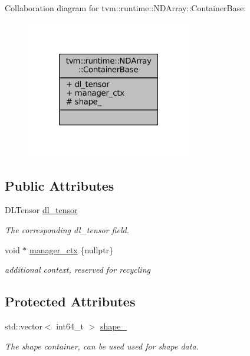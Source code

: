 Collaboration diagram for tvm\+:\+:runtime\+:\+:N\+D\+Array\+:\+:Container\+Base\+:
\nopagebreak
\begin{figure}[H]
\begin{center}
\leavevmode
\includegraphics[width=205pt]{classtvm_1_1runtime_1_1NDArray_1_1ContainerBase__coll__graph}
\end{center}
\end{figure}
\subsection*{Public Attributes}
\begin{DoxyCompactItemize}
\item 
D\+L\+Tensor \hyperlink{classtvm_1_1runtime_1_1NDArray_1_1ContainerBase_a1063a9d01075d5b7b0e8fa31d4d72e0b}{dl\+\_\+tensor}
\begin{DoxyCompactList}\small\item\em The corresponding dl\+\_\+tensor field. \end{DoxyCompactList}\item 
void $\ast$ \hyperlink{classtvm_1_1runtime_1_1NDArray_1_1ContainerBase_a56d07e60df973dcf2b99ef6a204bb184}{manager\+\_\+ctx} \{nullptr\}
\begin{DoxyCompactList}\small\item\em additional context, reserved for recycling \end{DoxyCompactList}\end{DoxyCompactItemize}
\subsection*{Protected Attributes}
\begin{DoxyCompactItemize}
\item 
std\+::vector$<$ int64\+\_\+t $>$ \hyperlink{classtvm_1_1runtime_1_1NDArray_1_1ContainerBase_a852a3d49f916098ea6012237dbd242fc}{shape\+\_\+}
\begin{DoxyCompactList}\small\item\em The shape container, can be used used for shape data. \end{DoxyCompactList}\end{DoxyCompactItemize}


